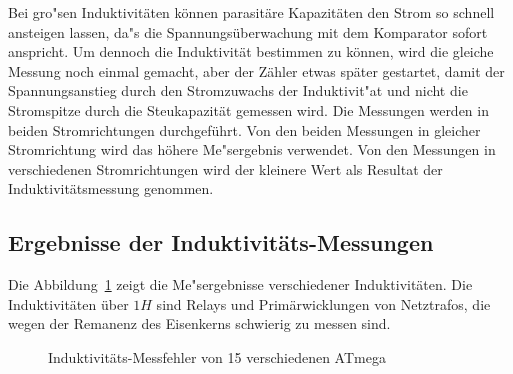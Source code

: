 Bei gro"sen Induktivit\"aten k\"onnen parasit\"are Kapazit\"aten den Strom so schnell ansteigen lassen, da"s
die Spannungs\"uberwachung mit dem Komparator sofort anspricht. Um dennoch die Induktivit\"at bestimmen zu
k\"onnen, wird die gleiche Messung noch einmal gemacht, aber der Z\"ahler etwas sp\"ater gestartet, damit
der Spannungsanstieg durch den Stromzuwachs der Induktivit"at und nicht die Stromspitze durch die
Steukapazit\"at gemessen wird.
Die Messungen werden in beiden Stromrichtungen durchgef\"uhrt.
Von den beiden Messungen in gleicher Stromrichtung wird das h\"ohere Me"sergebnis verwendet.
Von den Messungen in verschiedenen Stromrichtungen wird der kleinere Wert als Resultat der Induktivit\"atsmessung genommen.

\subsection{Ergebnisse der Induktivit\"ats-Messungen}
Die Abbildung~\ref{fig:Induct328p} zeigt die Me"sergebnisse verschiedener Induktivit\"aten.
Die Induktivit\"aten \"uber \(1 H\) sind Relays und Prim\"arwicklungen von Netztrafos, die wegen
der Remanenz des Eisenkerns schwierig zu messen sind.

\begin{figure}[H]
\centering

\caption{Induktivit\"ats-Messfehler von 15 verschiedenen ATmega}
\label{fig:Induct328p}
\end{figure}
